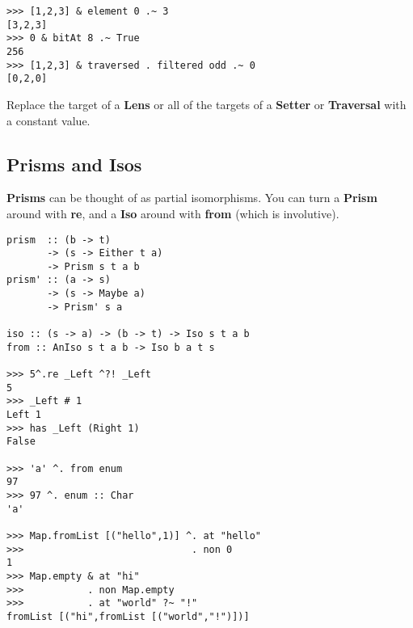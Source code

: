 \begin{multicols}{2}
\begin{box1}
\begin{verbatim}
>>> [1,2,3] & element 0 .~ 3
[3,2,3]
>>> 0 & bitAt 8 .~ True
256
>>> [1,2,3] & traversed . filtered odd .~ 0
[0,2,0]
\end{verbatim}

Replace the target of a \textbf{Lens} or all of the targets of a
\textbf{Setter} or \textbf{Traversal} with a constant value.

\end{box1}

\begin{box2}
\subsection *{Prisms and Isos}

\textbf{Prisms} can be thought of as partial isomorphisms. You can turn a
\textbf{Prism} around with \textbf{re}, and a \textbf{Iso} around with
\textbf{from} (which is involutive).

\begin{verbatim}
prism  :: (b -> t)
       -> (s -> Either t a)
       -> Prism s t a b
prism' :: (a -> s)
       -> (s -> Maybe a)
       -> Prism' s a

iso :: (s -> a) -> (b -> t) -> Iso s t a b
from :: AnIso s t a b -> Iso b a t s

>>> 5^.re _Left ^?! _Left
5
>>> _Left # 1
Left 1
>>> has _Left (Right 1)
False

>>> 'a' ^. from enum
97
>>> 97 ^. enum :: Char
'a'

>>> Map.fromList [("hello",1)] ^. at "hello"
>>>                             . non 0
1
>>> Map.empty & at "hi"
>>>           . non Map.empty
>>>           . at "world" ?~ "!"
fromList [("hi",fromList [("world","!")])]

\end{verbatim}

\end{box2}

\end{multicols}

